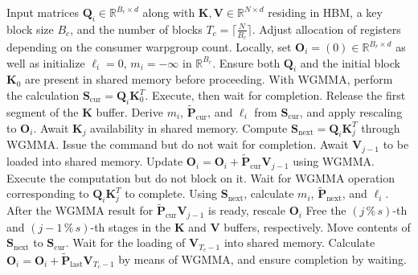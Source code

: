\begin{enumerate}
\begin{algorithm}[H]
    \caption{\small\label{alg:flash3_wgmma}\textsc{FlashAttention-3} consumer warpgroup forward pass}
    \begin{algorithmic}[1]
      \REQUIRE  Input matrices $\mathbf{Q}_i \in \mathbb{R}^{B_r \times d}$ along with $\mathbf{K}, \mathbf{V} \in \mathbb{R}^{N \times d}$ residing in HBM, a key block size $B_c$, and the number of blocks $T_c = \lceil \frac{N}{B_c} \rceil$.
      \STATE Adjust allocation of registers depending on the consumer warpgroup count.
      \STATE Locally, set $\mathbf{O}_i = (0) \in \mathbb{R}^{B_r \times d}$ as well as initialize $\ell_i = 0$, $m_i = -\infty$ in $\mathbb{R}^{B_r}$.
      \STATE Ensure both $\mathbf{Q}_i$ and the initial block $\mathbf{K}_0$ are present in shared memory before proceeding.
      \STATE With WGMMA, perform the calculation $\mathbf{S}_{\mathrm{cur}} = \mathbf{Q}_i \mathbf{K}_0^T$. Execute, then wait for completion.
      \STATE Release the first segment of the $\mathbf{K}$ buffer.
      \STATE Derive $m_{i}$, $\tilde{\mathbf{P}}_{\mathrm{cur}}$, and $\ell_{i}$ from $\mathbf{S}_{\mathrm{cur}}$, and apply rescaling to $\mathbf{O}_i$.
        \STATE Await $\mathbf{K}_j$ availability in shared memory.
        \label{code:mainloop_start}
        \STATE Compute $\mathbf{S}_{\mathrm{next}} = \mathbf{Q}_i \mathbf{K}_{j}^T$ through WGMMA. Issue the command but do not wait for completion. \label{code:first_wgmma}
        \STATE Await $\mathbf{V}_{j-1}$ to be loaded into shared memory.
        \STATE Update $\mathbf{O}_{i} = \mathbf{O}_{i} + \tilde{\mathbf{P}}_{\mathrm{cur}} \mathbf{V}_{j-1}$ using WGMMA. Execute the computation but do not block on it. \label{code:second_wgmma}
        \STATE Wait for WGMMA operation corresponding to $\mathbf{Q}_i \mathbf{K}_{j}^T$ to complete.
        \STATE Using $\mathbf{S}_{\mathrm{next}}$, calculate $m_{i}$, $\tilde{\mathbf{P}}_{\mathrm{next}}$, and $\ell_{i}$. \label{code:softmax}
        \STATE After the WGMMA result for $\tilde{\mathbf{P}}_{\mathrm{cur}} \mathbf{V}_{j-1}$ is ready, rescale $\mathbf{O}_i$
        \STATE Free the $(j\,\%\,s)$-th and $(j-1\,\%\,s)$-th stages in the $\mathbf{K}$ and $\mathbf{V}$ buffers, respectively.
        \STATE Move contents of $\mathbf{S}_{\mathrm{next}}$ to $\mathbf{S}_{\mathrm{cur}}$.
        \label{code:mainloop_end}
      \ENDFOR \STATE Wait for the loading of $\mathbf{V}_{T_c - 1}$ into shared memory.
      \STATE Calculate
      $\mathbf{O}_{i} = \mathbf{O}_{i} + \tilde{\mathbf{P}}_{\mathrm{last}} \mathbf{V}_{T_c - 1}$ by means of WGMMA, and ensure completion by waiting.


\end{algorithmic}
\end{algorithm}
\end{enumerate}
